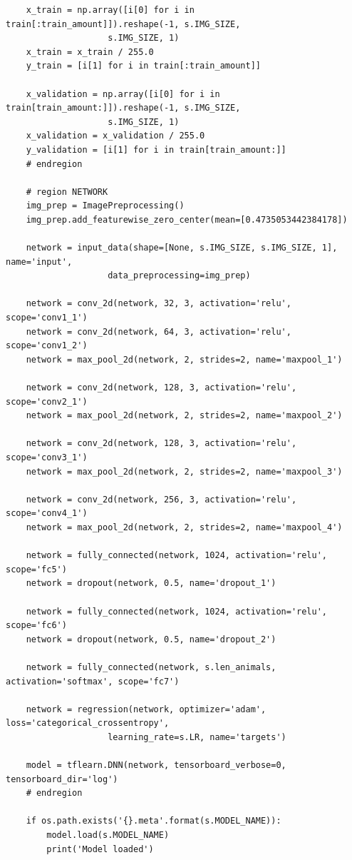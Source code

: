 \documentclass[12pt,a4paper]{article}
\begin{document}
\begin{itemize}
{\begin{verbatim}
    x_train = np.array([i[0] for i in train[:train_amount]]).reshape(-1, s.IMG_SIZE, 
                    s.IMG_SIZE, 1)
    x_train = x_train / 255.0
    y_train = [i[1] for i in train[:train_amount]]

    x_validation = np.array([i[0] for i in train[train_amount:]]).reshape(-1, s.IMG_SIZE, 
                    s.IMG_SIZE, 1)
    x_validation = x_validation / 255.0
    y_validation = [i[1] for i in train[train_amount:]]
    # endregion

    # region NETWORK
    img_prep = ImagePreprocessing()
    img_prep.add_featurewise_zero_center(mean=[0.4735053442384178])

    network = input_data(shape=[None, s.IMG_SIZE, s.IMG_SIZE, 1], name='input',
                    data_preprocessing=img_prep)

    network = conv_2d(network, 32, 3, activation='relu', scope='conv1_1')
    network = conv_2d(network, 64, 3, activation='relu', scope='conv1_2')
    network = max_pool_2d(network, 2, strides=2, name='maxpool_1')

    network = conv_2d(network, 128, 3, activation='relu', scope='conv2_1')
    network = max_pool_2d(network, 2, strides=2, name='maxpool_2')

    network = conv_2d(network, 128, 3, activation='relu', scope='conv3_1')
    network = max_pool_2d(network, 2, strides=2, name='maxpool_3')

    network = conv_2d(network, 256, 3, activation='relu', scope='conv4_1')
    network = max_pool_2d(network, 2, strides=2, name='maxpool_4')

    network = fully_connected(network, 1024, activation='relu', scope='fc5')
    network = dropout(network, 0.5, name='dropout_1')

    network = fully_connected(network, 1024, activation='relu', scope='fc6')
    network = dropout(network, 0.5, name='dropout_2')

    network = fully_connected(network, s.len_animals, activation='softmax', scope='fc7')

    network = regression(network, optimizer='adam', loss='categorical_crossentropy', 
                    learning_rate=s.LR, name='targets')

    model = tflearn.DNN(network, tensorboard_verbose=0, tensorboard_dir='log')
    # endregion

    if os.path.exists('{}.meta'.format(s.MODEL_NAME)):
        model.load(s.MODEL_NAME)
        print('Model loaded')


\end{verbatim}}
\end{itemize}
\end{document}
